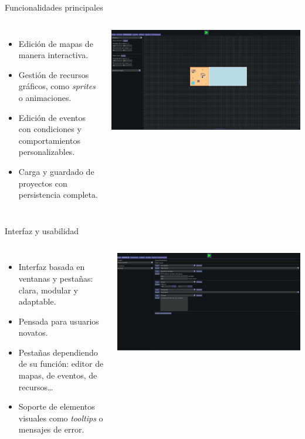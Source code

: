 \documentclass{beamer}
\begin{document}
\begin{frame}{Funcionalidades principales}
	\begin{columns}
			\begin{itemize}
				\item Edición de mapas de manera interactiva.
				\item Gestión de recursos gráficos, como \textit{sprites} o animaciones.
				\item Edición de eventos con condiciones y comportamientos personalizables.
				\item Carga y guardado de proyectos con persistencia completa.
			\end{itemize}
			\includegraphics[width=\textwidth]{imgs/editor/conexiones.pdf}
	\end{columns}
\end{frame}

\begin{frame}{Interfaz y usabilidad}
	\begin{columns}
		 \column{0.4\textwidth}
		 	\begin{itemize}
		 		\item Interfaz basada en ventanas y pestañas: clara, modular y adaptable.
		 		\item Pensada para usuarios novatos.
		 		\item Pestañas dependiendo de su función: editor de mapas, de eventos, de recursos\ldots
		 		\item Soporte de elementos visuales como \textit{tooltips} o mensajes de error.
		 	\end{itemize}
		 \column{0.6\textwidth}
		 	\includegraphics[width=\textwidth]{imgs/editor/eventos.pdf}
	\end{columns}
\end{frame}
\end{document}
